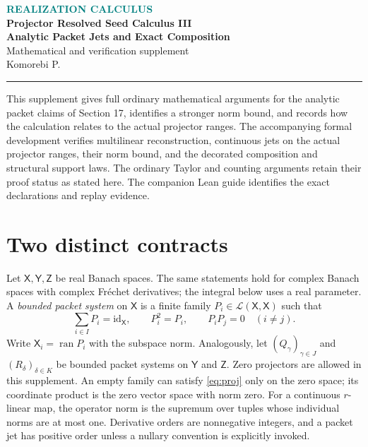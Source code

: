 \documentclass[11pt]{article}
\theoremstyle{remark}\newtheorem{remark}[theorem]{Remark}
\newcommand{\X}{\mathsf X}\newcommand{\Y}{\mathsf Y}\newcommand{\Z}{\mathsf Z}
\newcommand{\id}{\mathrm{id}}
\newcommand{\op}{\operatorname}
\begin{document}
\begin{center}
{\small\bfseries\textcolor{teal}{REALIZATION CALCULUS}}\\[5pt]
{\Large\bfseries Projector Resolved Seed Calculus III}\\[7pt]
{\LARGE\bfseries Analytic Packet Jets and Exact Composition}\\[8pt]
{\large Mathematical and verification supplement}\\[8pt]
{\normalsize Komorebi P.}
\end{center}
\vspace{6pt}
\noindent\rule{\linewidth}{.8pt}
\vspace{4pt}
This supplement gives full ordinary mathematical arguments for the analytic packet claims of Section 17, identifies a stronger norm bound, and records how the calculation relates to the actual projector ranges. The accompanying formal development verifies multilinear reconstruction, continuous jets on the actual projector ranges, their norm bound, and the decorated composition and structural support laws. The ordinary Taylor and counting arguments retain their proof status as stated here. The companion Lean guide identifies the exact declarations and replay evidence.

\section{Two distinct contracts}
Let $\X,\Y,\Z$ be real Banach spaces. The same statements hold for complex Banach spaces with complex Fr\'echet derivatives; the integral below uses a real parameter. A \emph{bounded packet system} on $\X$ is a finite family $P_i\in\mathcal L(\X,\X)$ such that
\begin{equation}\label{eq:proj}
\sum_{i\in I}P_i=\id_{\X},\qquad P_i^2=P_i,\qquad P_iP_j=0\quad(i\ne j).
\end{equation}
Write $\X_i=\op{ran}P_i$ with the subspace norm. Analogously, let $(Q_\gamma)_{\gamma\in J}$ and $(R_\delta)_{\delta\in K}$ be bounded packet systems on $\Y$ and $\Z$. Zero projectors are allowed in this supplement. An empty family can satisfy \eqref{eq:proj} only on the zero space; its coordinate product is the zero vector space with norm zero. For a continuous $r$-linear map, the operator norm is the supremum over tuples whose individual norms are at most one. Derivative orders are nonnegative integers, and a packet jet has positive order unless a nullary convention is explicitly invoked.
\end{document}
